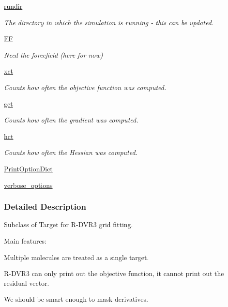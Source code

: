 \begin{DoxyCompactItemize}
\hyperlink{classforcebalance_1_1target_1_1Target_a6872de5b2d4273b82336ea5b0da29c9e}{rundir}
\begin{DoxyCompactList}\small\item\em The directory in which the simulation is running -\/ this can be updated. \end{DoxyCompactList}\item 
\hyperlink{classforcebalance_1_1target_1_1Target_a38a37919783141ea37fdcf8b00ce0aaf}{F\-F}
\begin{DoxyCompactList}\small\item\em Need the forcefield (here for now) \end{DoxyCompactList}\item 
\hyperlink{classforcebalance_1_1target_1_1Target_aad2e385cfbf7b4a68f1c2cb41133fe82}{xct}
\begin{DoxyCompactList}\small\item\em Counts how often the objective function was computed. \end{DoxyCompactList}\item 
\hyperlink{classforcebalance_1_1target_1_1Target_aa625ac88c6744eb14ef281d9496d0dbb}{gct}
\begin{DoxyCompactList}\small\item\em Counts how often the gradient was computed. \end{DoxyCompactList}\item 
\hyperlink{classforcebalance_1_1target_1_1Target_a5b5a42f78052b47f29ed4b940c6111a1}{hct}
\begin{DoxyCompactList}\small\item\em Counts how often the Hessian was computed. \end{DoxyCompactList}\item 
\hyperlink{classforcebalance_1_1BaseClass_afc6659278497d7245bc492ecf405ccae}{Print\-Option\-Dict}
\item 
\hyperlink{classforcebalance_1_1BaseClass_afd68efa29ccd2f320f4cf82198214aac}{verbose\-\_\-options}
\end{DoxyCompactItemize}


\subsubsection{Detailed Description}
Subclass of Target for R-\/\-D\-V\-R3 grid fitting. 

Main features\-:
\begin{DoxyItemize}
\item Multiple molecules are treated as a single target.
\item R-\/\-D\-V\-R3 can only print out the objective function, it cannot print out the residual vector.
\item We should be smart enough to mask derivatives. 
\end{DoxyItemize}

